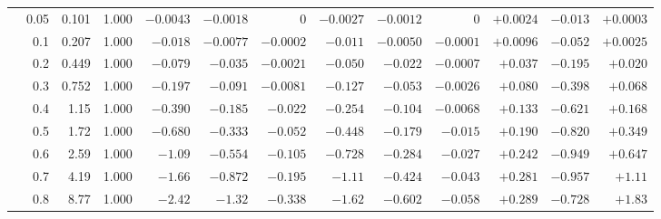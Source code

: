 \documentclass[11pt,a4paper]{article}
\begin{document}
\begin{table}[htbp]
\begin{tabular}{rrrrrrrrrrrrr}
 & 0.05 & 0.101 & 1.000 & $-0.0043$ & $-0.0018$ & $0$ & $-0.0027$ & $-0.0012$ & $0$ & $+0.0024$ & $-0.013$ & $+0.0003$ \\
 & 0.1 & 0.207 & 1.000 & $-0.018$ & $-0.0077$ & $-0.0002$ & $-0.011$ & $-0.0050$ & $-0.0001$ & $+0.0096$ & $-0.052$ & $+0.0025$ \\
 & 0.2 & 0.449 & 1.000 & $-0.079$ & $-0.035$ & $-0.0021$ & $-0.050$ & $-0.022$ & $-0.0007$ & $+0.037$ & $-0.195$ & $+0.020$ \\
 & 0.3 & 0.752 & 1.000 & $-0.197$ & $-0.091$ & $-0.0081$ & $-0.127$ & $-0.053$ & $-0.0026$ & $+0.080$ & $-0.398$ & $+0.068$ \\
 & 0.4 & 1.15 & 1.000 & $-0.390$ & $-0.185$ & $-0.022$ & $-0.254$ & $-0.104$ & $-0.0068$ & $+0.133$ & $-0.621$ & $+0.168$ \\
 & 0.5 & 1.72 & 1.000 & $-0.680$ & $-0.333$ & $-0.052$ & $-0.448$ & $-0.179$ & $-0.015$ & $+0.190$ & $-0.820$ & $+0.349$ \\
 & 0.6 & 2.59 & 1.000 & $-1.09$ & $-0.554$ & $-0.105$ & $-0.728$ & $-0.284$ & $-0.027$ & $+0.242$ & $-0.949$ & $+0.647$ \\
 & 0.7 & 4.19 & 1.000 & $-1.66$ & $-0.872$ & $-0.195$ & $-1.11$ & $-0.424$ & $-0.043$ & $+0.281$ & $-0.957$ & $+1.11$ \\
 & 0.8 & 8.77 & 1.000 & $-2.42$ & $-1.32$ & $-0.338$ & $-1.62$ & $-0.602$ & $-0.058$ & $+0.289$ & $-0.728$ & $+1.83$ \\
\bottomrule
\end{tabular}
\end{table}
\end{document}
